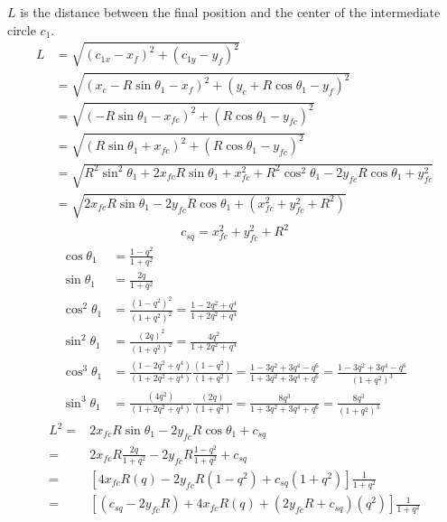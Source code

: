 \documentclass[12pt]{article}
\begin{document}
$L$ is the distance between the final position and the center of the intermediate circle $c_1$.
\begin{align}
    L &= \sqrt{(c_{1x} - x_f)^2 + (c_{1y} - y_f)^2}\\
    &= \sqrt{(x_c-R\sin\theta_1 - x_f)^2 + (y_c + R\cos\theta_1 - y_f)^2}\\
    &= \sqrt{(-R\sin\theta_1 - x_{fc})^2 + (R\cos\theta_1 - y_{fc})^2}\\
    &= \sqrt{(R\sin\theta_1 + x_{fc})^2 + (R\cos\theta_1 - y_{fc})^2}\\
    &= \sqrt{R^2\sin^2\theta_1 + 2x_{fc}R\sin\theta_1 + x_{fc}^2 + R^2\cos^2\theta_1 - 2y_{fc}R\cos\theta_1 + y_{fc}^2}\\
    &= \sqrt{2x_{fc}R\sin\theta_1  - 2y_{fc}R\cos\theta_1 + (x_{fc}^2 + y_{fc}^2 + R^2)}%
\end{align}
\begin{align}
    c_{sq} = x_{fc}^2 + y_{fc}^2 + R^2
\end{align}
\begin{align}
    \cos\theta_1 &= \frac{1-q^2}{1+q^2}\\
    \sin\theta_1 &= \frac{2q}{1+q^2}\\
    \cos^2\theta_1 &= \frac{(1-q^2)^2}{(1+q^2)^2} = \frac{1-2q^2+q^4}{1+2q^2+q^4}\\
    \sin^2\theta_1 &= \frac{(2q)^2}{(1+q^2)^2} = \frac{4q^2}{1+2q^2+q^4}\\
    \cos^3\theta_1 &= \frac{(1-2q^2+q^4)}{(1+2q^2+q^4)}\frac{(1-q^2)}{(1+q^2)} = \frac{1-3q^2+3q^4-q^6}{1+3q^2+3q^4+q^6} = \frac{1-3q^2+3q^4-q^6}{(1+q^2)^3}\\
    \sin^3\theta_1 &= \frac{(4q^2)}{(1+2q^2+q^4)}\frac{(2q)}{(1+q^2)} = \frac{8q^3}{1+3q^2+3q^4+q^6} = \frac{8q^3}{(1+q^2)^3}
\end{align}
\begin{align}
    L^2 =& 2x_{fc}R\sin\theta_1  - 2y_{fc}R\cos\theta_1 + c_{sq}\\
    =& 2x_{fc}R\frac{2q}{1+q^2}  - 2y_{fc}R\frac{1-q^2}{1+q^2} + c_{sq}\\
    =& [ 4x_{fc}R(q)  - 2y_{fc}R(1-q^2) + c_{sq}(1+q^2)]\frac{1}{1+q^2}\\
    =& [ (c_{sq} - 2y_{fc}R) + 4x_{fc}R(q)  + (2y_{fc}R+ c_{sq})(q^2)]\frac{1}{1+q^2}
\end{align}
\end{document}
